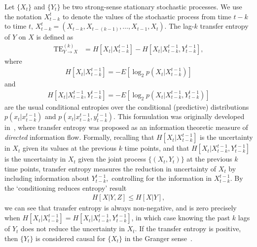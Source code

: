 Let $\{X_{t}\}$ and $\{ Y_{t}\}$ be two strong-sense stationary stochastic processes. We use the notation $X_{t-k}^{t}$ to denote the values of the stochastic process from time $t-k$ to time $t$, $X_{t-k}^{t} = (X_{t-k}, X_{t-(k-1)}, \ldots, X_{t - 1}, X_{t})$. The lag-$k$ transfer entropy of $Y$ on $X$ is defined as 
\begin{align}
	\text{TE}_{Y \to X}^{(k)} &= H\left[X_{t} | X_{t-k}^{t-1}\right] - H\left[X_{t} | X_{t-k}^{t-1}, Y_{t-k}^{t-1}\right],
\end{align}
where
\begin{align}
	H\left[X_{t} | X_{t-k}^{t-1}\right] = - E\left[ \log_{2} p(X_{t} | X_{t-k}^{t-1}) \right]
\end{align}
and 
\begin{align}
	H\left[X_{t} | X_{t-k}^{t-1}, Y_{t-k}^{t-1}\right] = - E\left[ \log_{2} p(X_{t} | X_{t-k}^{t-1}, Y_{t-k}^{t-1}) \right]
\end{align}
are the usual conditional entropies over the conditional (predictive) distributions $p(x_{t} | x_{t-k}^{t-1})$ and $p(x_{t} | x_{t-k}^{t-1}, y_{t-k}^{t-1})$. This formulation was originally developed in~\cite{schreiber2000measuring}, where transfer entropy was proposed as an information theoretic measure of \emph{directed} information flow. Formally, recalling that $H\left[X_{t} | X_{t-k}^{t-1}\right]$ is the uncertainty in $X_{t}$ given its values at the previous $k$ time points, and that $H\left[X_{t} | X_{t-k}^{t-1}, Y_{t-k}^{t-1}\right]$ is the uncertainty in $X_{t}$ given the joint process $\{(X_{t}, Y_{t})\}$ at the previous $k$ time points, transfer entropy measures the reduction in uncertainty of $X_{t}$ by including information about $Y_{t-k}^{t-1},$ controlling for the information in $X_{t - k}^{t-1}$. By the `conditioning reduces entropy' result~\cite{cover2012elements}
\begin{align}
	H[X | Y, Z] \leq H[X | Y],
\end{align}
we can see that transfer entropy is always non-negative, and is zero precisely when $H\left[X_{t} | X_{t-k}^{t-1}\right] = H\left[X_{t} | X_{t-k}^{t-1}, Y_{t-k}^{t-1}\right]$, in which case knowing the past $k$ lags of $Y_{t}$ does not reduce the uncertainty in $X_{t}$. If the transfer entropy is positive, then $\{ Y_{t}\}$ is considered causal for $\{ X_{t}\}$ in the Granger sense~\cite{granger1963economic}.

